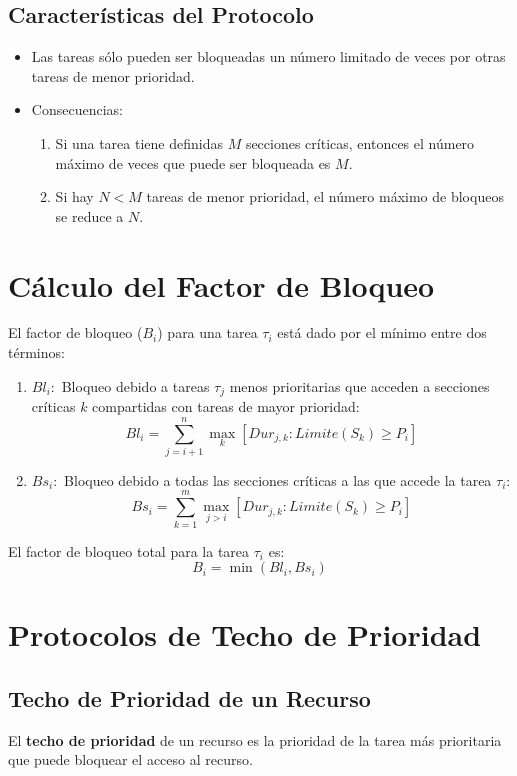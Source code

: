 \documentclass[a4paper,12pt]{article}
\begin{document}
\subsection{Características del Protocolo}
\begin{itemize}
    \item Las tareas sólo pueden ser bloqueadas un número limitado de veces por otras tareas de menor prioridad.
    \item Consecuencias:
    \begin{enumerate}
        \item Si una tarea tiene definidas \(M\) secciones críticas, entonces el número máximo de veces que puede ser bloqueada es \(M\).
        \item Si hay \(N < M\) tareas de menor prioridad, el número máximo de bloqueos se reduce a \(N\).
    \end{enumerate}
\end{itemize}

\section{Cálculo del Factor de Bloqueo}

El factor de bloqueo (\(B_i\)) para una tarea \(\tau_i\) está dado por el mínimo entre dos términos:

\begin{enumerate}
    \item \(Bl_i:\) Bloqueo debido a tareas \(\tau_j\) menos prioritarias que acceden a secciones críticas \(k\) compartidas con tareas de mayor prioridad:
    \[
    Bl_i = \sum_{j=i+1}^{n} \max_k[Dur_{j,k} : Limite(S_k) \geq P_i]
    \]

    \item \(Bs_i:\) Bloqueo debido a todas las secciones críticas a las que accede la tarea \(\tau_i\):
    \[
    Bs_i = \sum_{k=1}^{m} \max_{j>i}[Dur_{j,k} : Limite(S_k) \geq P_i]
    \]
\end{enumerate}

El factor de bloqueo total para la tarea \(\tau_i\) es:
\[
B_i = \min(Bl_i, Bs_i)
\]

\section{Protocolos de Techo de Prioridad}

\subsection{Techo de Prioridad de un Recurso}
El \textbf{techo de prioridad} de un recurso es la prioridad de la tarea más prioritaria que puede bloquear el acceso al recurso.
\end{document}
